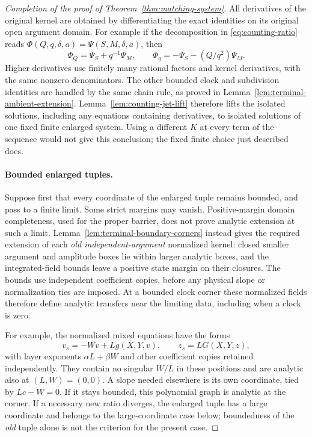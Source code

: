 \begin{proof}[Completion of the proof of Theorem~\ref{thm:matching-system}]
All derivatives of the original kernel are obtained by differentiating
the exact identities on its original open argument domain.  For
example if the decomposition in \eqref{eq:counting-ratio} reads
$\Phi(Q,q,\delta,a)=\Psi(S,M,\delta,a)$, then
\[
 \Phi_Q=\Psi_S+q^{-1}\Psi_M,
 \qquad
 \Phi_q=-\Psi_S-(Q/q^2)\Psi_M.
\]
Higher derivatives use finitely many rational factors and kernel
derivatives, with the same nonzero denominators.  The other bounded
clock and subdivision identities are handled by the same chain rule,
as proved in Lemma~\ref{lem:terminal-ambient-extension}.
Lemma~\ref{lem:counting-jet-lift} therefore lifts the isolated
solutions, including any equations containing derivatives, to
isolated solutions of one fixed finite enlarged system.  Using a
different $K$ at every term of the sequence would not give this
conclusion; the fixed finite choice just described does.

\paragraph{Bounded enlarged tuples.}
Suppose first that every coordinate of the enlarged tuple remains
bounded, and pass to a finite limit.  Some strict margins may vanish.
Positive-margin domain completeness, used for the proper barrier,
does not prove analytic extension at such a limit.
Lemma~\ref{lem:terminal-boundary-corners} instead gives the required
extension of each \emph{old independent-argument} normalized kernel:
closed smaller argument and amplitude boxes lie within larger analytic
boxes, and the integrated-field bounds leave a positive state margin
on their closures.  The bounds use independent coefficient copies,
before any physical slope or normalization ties are imposed.  At a
bounded clock corner these normalized fields therefore define analytic
transfers near the limiting data, including when a clock is zero.

For example, the normalized mixed equations have the forms
\[
 v_s=-Wv+L g(X,Y,v),\qquad z_s=L G(X,Y,z),
\]
with layer exponents $\alpha L+\beta W$ and other coefficient copies
retained independently.  They contain no singular $W/L$ in these
positions and are analytic also at $(L,W)=(0,0)$.  A slope needed
elsewhere is its own coordinate, tied by $L c-W=0$.  If it stays
bounded, this polynomial graph is analytic at the corner.  If a
necessary new ratio diverges, the enlarged tuple has a large coordinate
and belongs to the large-coordinate case below; boundedness of the
\emph{old} tuple alone is not the criterion for the present case.


\end{proof}
